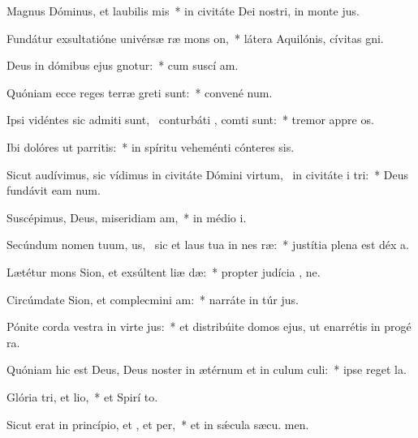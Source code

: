 \item Magnus Dóminus, et laubilis mis~* in civitáte Dei nostri, in monte  jus.
\item Fundátur exsultatióne univérsæ ræ mons on,~* látera Aquilónis, cívitas  gni.
\item Deus in dómibus ejus gnotur:~* cum suscí am.
\item Quóniam ecce reges terræ greti sunt:~* convené  num.
\item Ipsi vidéntes sic admiti sunt,~\pscross{} conturbáti , comti sunt:~* tremor appre os.
\item Ibi dolóres ut parritis:~* in spíritu veheménti cónteres  sis.
\item Sicut audívimus, sic vídimus in civitáte Dómini virtum,~\pscross{} in civitáte i tri:~* Deus fundávit eam  num.
\item Suscépimus, Deus, miseridiam am,~* in médio  i.
\item Secúndum nomen tuum, us,~\pscross{} sic et laus tua in nes ræ:~* justítia plena est déx a.
\item Lætétur mons Sion, et exsúltent liæ dæ:~* propter judícia , ne.
\item Circúmdate Sion, et complecmini am:~* narráte in túr jus.
\item Pónite corda vestra in virte jus:~* et distribúite domos ejus, ut enarrétis in progé ra.
\item Quóniam hic est Deus, Deus noster in ætérnum et in culum culi:~* ipse reget   la.
\item Glória tri, et lio,~* et Spirí to.
\item Sicut erat in princípio, et , et per,~* et in sǽcula sæcu. men.
